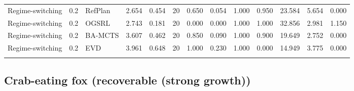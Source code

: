 \documentclass[10pt]{article}
\begin{document}
\begin{landscape}
\begin{center}
\begin{longtable}{@{}lllr@{}r@{}r@{}rrrrrrr@{}}
\addlinespace[1.5pt]
Regime-switching & 0.2 & RefPlan & 2.654 & 0.454 & 20 & 0.650 & 0.054 & 1.000 & 0.950 & 23.584 & 5.654 & 0.000 \\
Regime-switching & 0.2 & OGSRL & 2.743 & 0.181 & 20 & 0.000 & 0.000 & 1.000 & 1.000 & 32.856 & 2.981 & 1.150 \\
Regime-switching & 0.2 & BA-MCTS & 3.607 & 0.462 & 20 & 0.850 & 0.090 & 1.000 & 0.900 & 19.649 & 2.752 & 0.000 \\
Regime-switching & 0.2 & EVD & 3.961 & 0.648 & 20 & 1.000 & 0.230 & 1.000 & 0.000 & 14.949 & 3.775 & 0.000 \\
\addlinespace[1.5pt]
\end{longtable}
\end{center}
\end{landscape}
\subsection{Crab-eating fox (recoverable (strong growth))}
\end{document}
